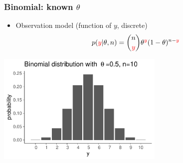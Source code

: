 \documentclass[10pt]{beamer}
\begin{document}
\begin{frame}
  \frametitle{Binomial: known $\theta$}

  \begin{itemize}
  \item {\color{blue}Observation model} (function of {\color{red} $y$}, discrete)
    \begin{align*}
      p({\color{red}y}|\theta,n) = \binom{n}{{\color{red}y}} \theta^{\color{red}y}(1-\theta)^{n-{\color{red}y}}
    \end{align*}
  \end{itemize}

  \begin{center}
    {\includegraphics[width=8cm]{figs/dbinom10.pdf}\\
      \vspace{-0.6\baselineskip}
}
\end{center}
\end{frame}
\end{document}
